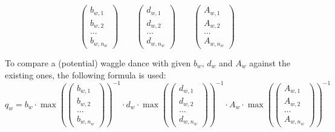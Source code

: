 			\[
				\begin{pmatrix}
					b_{w,1} \\ b_{w,2} \\ \dots \\ b_{w,n_w}
				\end{pmatrix}
				\qquad
				\begin{pmatrix}
					d_{w,1} \\ d_{w,2} \\ \dots \\ d_{w,n_w}
				\end{pmatrix}
				\qquad
				\begin{pmatrix}
					A_{w,1} \\ A_{w,2} \\ \dots \\ A_{w,n_w}
				\end{pmatrix}
			\]
			
			To compare a (potential) waggle dance with given $b_w$, $d_w$ and $A_w$ against the existing ones, the following formula is used:
			\begin{equation}\label{eq:evalPatchQuality}
				q_w = b_w \cdot
				\max(
				\begin{pmatrix}
					b_{w,1} \\ b_{w,2} \\ \dots \\ b_{w,n_w}
				\end{pmatrix})^{-1}
				\cdot
				d_w \cdot
				\max(
				\begin{pmatrix}
					d_{w,1} \\ d_{w,2} \\ \dots \\ d_{w,n_w}
				\end{pmatrix})^{-1}
				\cdot
				A_w \cdot
				\max(
				\begin{pmatrix}
					A_{w,1} \\ A_{w,2} \\ \dots \\ A_{w,n_w}
				\end{pmatrix})^{-1}
			\end{equation}
			
